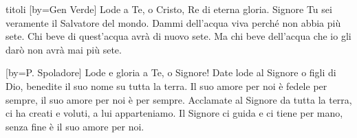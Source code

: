 \begin{songs}{titoli}
[by={Gen Verde}]
\beginchorus
Lode a Te, o Cristo,
Re di eterna gloria. 
\endchorus
\beginverse
Signore Tu sei veramente
il Salvatore del mondo.
Dammi dell'acqua viva
perché non abbia più sete.
\endverse
\beginverse
Chi beve di quest'acqua
avrà di nuovo sete.
Ma chi beve dell'acqua che io gli darò
non avrà mai più sete.
\endverse
\endsong

[by={P. Spoladore}]
\beginchorus
Lode e gloria a Te, o Signore! 
\endchorus
\beginverse
Date lode al Signore o figli di Dio,
benedite il suo nome su tutta la terra.
Il suo amore per noi è fedele per sempre,
il suo amore per noi è per sempre.
\endverse
\beginverse
Acclamate al Signore da tutta la terra,
ci ha creati e voluti, a lui apparteniamo.
Il Signore ci guida e ci tiene per mano,
senza fine è il suo amore per noi.
\endverse
\endsong

\end{songs}
